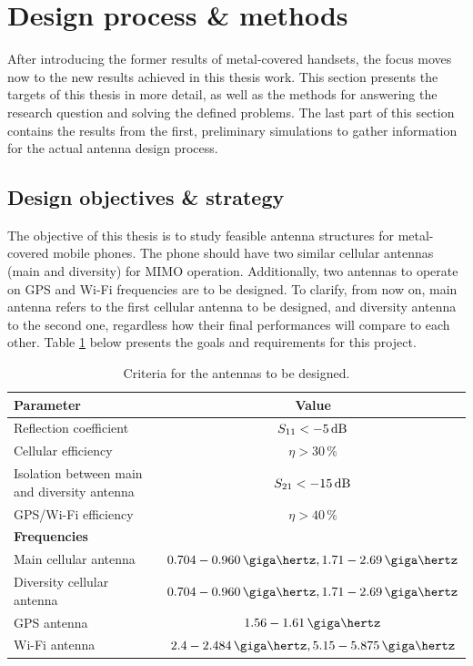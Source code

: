 \section{Design process \& methods}
\label{sec:objectives}
After introducing the former results of metal-covered handsets, the focus moves now to the new results achieved in this thesis work. This section presents the targets of this thesis in more detail, as well as the methods for answering the research question and solving the defined problems. The last part of this section contains the results from the first, preliminary simulations to gather information for the actual antenna design process.

\subsection{Design objectives \& strategy}
\label{sec:strategy}
The objective of this thesis is to study feasible antenna structures for metal-covered mobile phones. The phone should have two similar cellular antennas (main and diversity) for MIMO operation. Additionally, two antennas to operate on GPS and Wi-Fi frequencies are to be designed. To clarify, from now on, main antenna refers to the first cellular antenna to be designed, and diversity antenna to the second one, regardless how their final performances will compare to each other. Table \ref{tab:design_goals} below presents the goals and requirements for this project.

\begin{table}[H]
    \centering
    \caption{Criteria for the antennas to be designed.}
    \label{tab:design_goals}
    \begin{tabular}{|l|c|}
        \hline
         \textbf{Parameter} & \textbf{Value} \\
         \hline
         Reflection coefficient & $S_{11} < -5\,\mathrm{dB}$\\
         \hline
         Cellular efficiency & $\eta > 30\,\%$\\
         \hline
         Isolation between main and diversity antenna & $S_{21} < -15\,\mathrm{dB}$\\
         \hline
         GPS/Wi-Fi efficiency & $\eta > 40\,\%$\\
         \hline\hline
         \textbf{Frequencies} & \\
         \hline
         Main cellular antenna & $0.704-0.960\,\giga\hertz, 1.71-2.69\,\giga\hertz$\\
         \hline
         Diversity cellular antenna & $0.704-0.960\,\giga\hertz, 1.71-2.69\,\giga\hertz$\\
         \hline
         GPS antenna & $1.56-1.61\,\giga\hertz$\\
         \hline
         Wi-Fi antenna & $2.4-2.484\,\giga\hertz, 5.15-5.875\,\giga\hertz$\\
         \hline
    \end{tabular}
\end{table}

